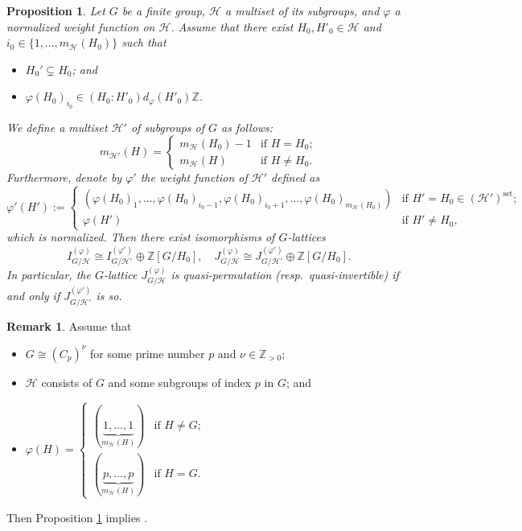 \documentclass[12pt]{amsart}
\theoremstyle{plain}
\newtheorem{prop}[thm]{Proposition}
\theoremstyle{definition}
\newtheorem{rem}[thm]{Remark}
\numberwithin{thm}{section}
\numberwithin{equation}{section}
\newcommand{\Zpn}{\mathbb{Z}_{>0}}
\newcommand{\Z}{\mathbb{Z}}
\newcommand{\cH}{\mathcal{H}}
\DeclareMathOperator{\set}{set}
\begin{document}
\begin{prop}\label{prop:rdtr}
Let $G$ be a finite group, $\cH$ a multiset of its subgroups, and $\varphi$ a normalized weight function on $\cH$. Assume that there exist $H_{0},H'_{0}\in \cH$ and $i_{0}\in \{1,\ldots,m_{\cH}(H_{0})\}$ such that
\begin{itemize}
\item $H_{0}'\subsetneq H_{0}$; and
\item $\varphi(H_{0})_{i_{0}}\in (H_{0}:H'_{0})d_{\varphi}(H'_{0})\Z$. %
\end{itemize}
We define a multiset $\cH'$ of subgroups of $G$ as follows: 
\begin{equation*}
m_{\cH'}(H)=
\begin{cases}
    m_{\cH}(H_{0})-1&\text{if }H=H_{0};\\
    m_{\cH}(H)&\text{if }H\neq H_{0}.
\end{cases}
\end{equation*}
Furthermore, denote by $\varphi'$ the weight function of $\cH'$ defined as 
\begin{equation*}
    \varphi'(H'):=
    \begin{cases}
        (\varphi(H_{0})_{1},\ldots,\varphi(H_{0})_{i_{0}-1},\varphi(H_{0})_{i_{0}+1},\ldots,\varphi(H_{0})_{m_{\cH}(H_{0})})&\text{if }H'=H_{0}\in (\cH')^{\set};\\
        \varphi(H')&\text{if }H'\neq H_{0},
    \end{cases}
\end{equation*}
which is normalized.
Then there exist isomorphisms of $G$-lattices
\begin{equation}\label{eq:incd}
I_{G/\cH}^{(\varphi)} \cong I_{G/\cH'}^{(\varphi')}\oplus \Z[G/H_{0}],\quad 
J_{G/\cH}^{(\varphi)} \cong J_{G/\cH'}^{(\varphi')}\oplus \Z[G/H_{0}]. 
\end{equation}
In particular, the $G$-lattice $J_{G/\cH}^{(\varphi)}$ is quasi-permutation (resp.~quasi-invertible) if and only if $J_{G/\cH'}^{(\varphi')}$ is so. 
\end{prop}

\begin{rem}
Assume that
\begin{itemize}
\item $G\cong (C_{p})^{\nu}$ for some prime number $p$ and $\nu \in \Zpn$; 
\item $\cH$ consists of $G$ and some subgroups of index $p$ in $G$; and
\item $\varphi(H)=
\begin{cases}
    (\underbrace{1,\ldots,1}_{m_{\cH}(H)})&\text{if }H\neq G;\\
    (\underbrace{p,\ldots,p}_{m_{\cH}(H)})&\text{if }H=G. 
\end{cases}
$
\end{itemize}
Then Proposition \ref{prop:rdtr} implies \cite[p.~29, Lemma]{Endo2001}. 
\end{rem}
\end{document}
